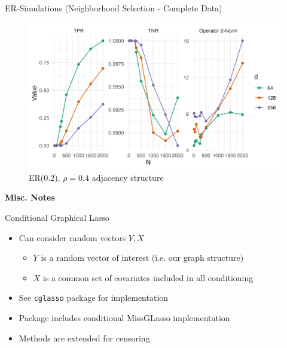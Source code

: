 \documentclass{beamer}
\begin{document}
\begin{frame}{ER-Simulations (Neighborhood Selection - Complete Data)}
    \begin{figure}
        \centering 
        \includegraphics[scale=0.65]{glasso_complete_ERmb_FixN_2.png}
        \caption{ER(0.2), $\rho=0.4$ adjacency structure}
    \end{figure}
\end{frame}



\begin{frame}{}
    \bf{\Large Misc. Notes}    
\end{frame}

\begin{frame}{Conditional Graphical Lasso}
    \begin{itemize}
        \item Can consider random vectors $Y, X$
        \begin{itemize}
            \item $Y$ is a random vector of interest (i.e. our graph structure)
            \item $X$ is a common set of covariates included in all conditioning
        \end{itemize}
        \item See \texttt{cglasso} package \cite{augugliaro_cglasso_2023} for implementation
        \item Package includes conditional MissGLasso implementation
        \item Methods are extended for censoring 
    \end{itemize}
\end{frame}
\end{document}
